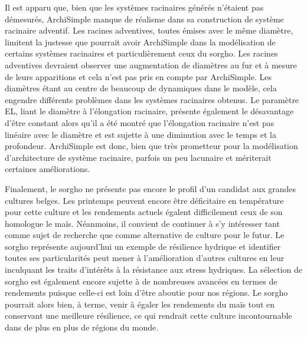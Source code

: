 Il est apparu que, bien que les systèmes racinaires générés n'étaient pas démesurés, ArchiSimple manque de réalisme dans sa construction de système racinaire adventif.
Les racines adventives, toutes émises avec le même diamètre, limitent la justesse que pourrait avoir ArchiSimple dans la modélisation de certains systèmes racinaires et particulièrement ceux du sorgho.
Les racines adventives devraient observer une augmentation de diamètres au fur et à mesure de leurs apparitions et cela n'est pas pris en compte par ArchiSimple.
Les diamètres étant au centre de beaucoup de dynamiques dans le modèle, cela engendre différents problèmes dans les systèmes racinaires obtenus.
Le paramètre EL, liant le diamètre à l'élongation racinaire, présente également le désavantage d'être constant alors qu'il a été montré que l'élongation racinaire n'est pas linéaire avec le diamètre et est sujette à une diminution avec le temps et la profondeur.
ArchiSimple est donc, bien que très prometteur pour la modélisation d'architecture de système racinaire, parfois un peu lacunaire et mériterait certaines améliorations.
\newline

Finalement, le sorgho ne présente pas encore le profil d'un candidat aux grandes cultures belges.
Les printemps peuvent encore être déficitaire en température pour cette culture et les rendements actuels égalent difficilement ceux de son homologue le maïs.
Néanmoins, il convient de continuer à s'y intéresser tant comme sujet de recherche que comme alternative de culture pour le futur.
Le sorgho représente aujourd'hui un exemple de résilience hydrique et identifier toutes ses particularités peut mener à l'amélioration d'autres cultures en leur inculquant les traits d'intérêts à la résistance aux stress hydriques.
La sélection de sorgho est également encore sujette à de nombreuses avancées en termes de rendements puisque celle-ci est loin d'être aboutie pour nos régions.
Le sorgho pourrait alors bien, à terme, venir à égaler les rendements du maïs tout en conservant une meilleure résilience, ce qui rendrait cette culture incontournable dans de plus en plus de régions du monde.